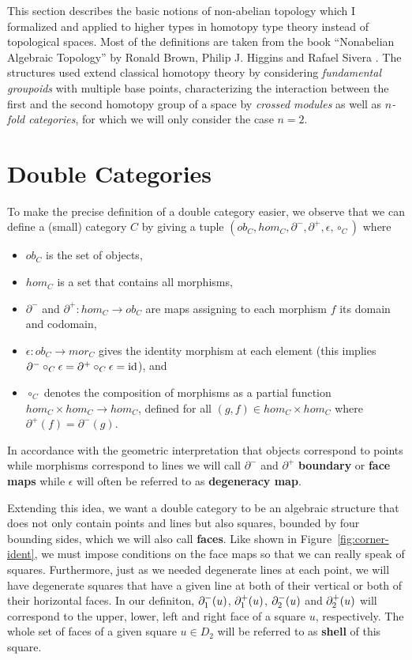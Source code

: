 This section describes the basic notions of non-abelian topology which I
formalized and applied to higher types in homotopy type theory instead of topological
spaces. Most of the definitions are taken from the book ``Nonabelian
Algebraic Topology'' by Ronald Brown, Philip J. Higgins and Rafael Sivera
\cite{nat}.
The structures used extend classical homotopy theory by considering
\emph{fundamental groupoids} with multiple base points, characterizing the 
interaction between the first and the second homotopy group of a space by 
\emph{crossed modules} as well as \emph{$n$-fold categories}, for which we will
only consider the case $n = 2$.

\section{Double Categories}
To make the precise definition of a double category easier, we observe that we
can define a (small) category $C$ by giving a tuple $(ob_C, hom_C, \partial^-,
\partial^+, \epsilon, \circ_C)$ where
\begin{itemize}
\item $ob_C$ is the set of objects,
\item $hom_C$ is a set that contains all morphisms,
\item $\partial^-$ and $\partial^+ : hom_C \to ob_C$
are maps assigning to each morphism $f$ its domain and codomain,
\item $\epsilon : ob_C \to mor_C$ gives the identity morphism at each element
(this implies $\partial^- \circ_C \epsilon = \partial^+ \circ_C \epsilon = \operatorname{id}$), and
\item $\circ_C$
denotes the composition of morphisms as a partial function $hom_C \times hom_C
\to hom_C$, defined for all $(g, f) \in hom_C \times hom_C$ where
$\partial^+(f) = \partial^-(g)$.
\end{itemize}

In accordance with the geometric interpretation that objects correspond to points while
morphisms correspond to lines we will call $\partial^-$ and $\partial^+$
\textbf{boundary} or \textbf{face maps} while $\epsilon$ will often be referred
to as \textbf{degeneracy map}.

Extending this idea, we want a double category to be an algebraic structure
that does not only contain points and lines but also squares, bounded by four
bounding sides, which we will also call \textbf{faces}.
Like shown in Figure~\ref{fig:corner-ident}, we must impose conditions on the
face maps so that we can really speak of squares.
Furthermore, just as we needed degenerate lines at each point, we will have
degenerate squares that have a given line at both of their vertical or 
both of their horizontal faces.
In our definiton, $\partial^-_1(u)$, $\partial^+_1(u)$, $\partial^-_2(u)$ and $\partial^+_2(u)$
will correspond to the upper, lower, left and right face of a square $u$, respectively.
The whole set of faces of a given square $u \in D_2$ will be referred to as
\textbf{shell} of this square.

